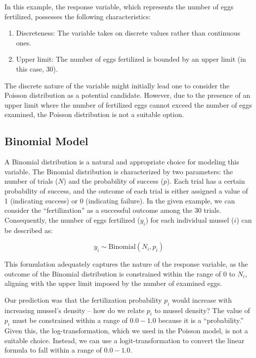 \documentclass[
]{book}
\begin{document}
In this example, the response variable, which represents the number of eggs fertilized, possesses the following characteristics:

\begin{enumerate}
\def\labelenumi{\arabic{enumi}.}
\item
  Discreteness: The variable takes on discrete values rather than continuous ones.
\item
  Upper limit: The number of eggs fertilized is bounded by an upper limit (in this case, 30).
\end{enumerate}

The discrete nature of the variable might initially lead one to consider the Poisson distribution as a potential candidate. However, due to the presence of an upper limit where the number of fertilized eggs cannot exceed the number of eggs examined, the Poisson distribution is not a suitable option.

\hypertarget{binomial-model}{%
\subsection{Binomial Model}\label{binomial-model}}

A Binomial distribution is a natural and appropriate choice for modeling this variable. The Binomial distribution is characterized by two parameters: the number of trials (\(N\)) and the probability of success (\(p\)). Each trial has a certain probability of success, and the outcome of each trial is either assigned a value of 1 (indicating success) or 0 (indicating failure). In the given example, we can consider the ``fertilization'' as a successful outcome among the 30 trials. Consequently, the number of eggs fertilized (\(y_i\)) for each individual mussel (\(i\)) can be described as:

\[
y_i \sim \text{Binomial}(N_i, p_i)
\]

This formulation adequately captures the nature of the response variable, as the outcome of the Binomial distribution is constrained within the range of \(0\) to \(N_i\), aligning with the upper limit imposed by the number of examined eggs.

Our prediction was that the fertilization probability \(p_i\) would increase with increasing mussel's density -- how do we relate \(p_i\) to mussel density? The value of \(p_i\) must be constrained within a range of \(0.0-1.0\) because it is a ``probability.'' Given this, the log-transformation, which we used in the Poisson model, is not a suitable choice. Instead, we can use a logit-transformation to convert the linear formula to fall within a range of \(0.0 - 1.0\).
\end{document}
